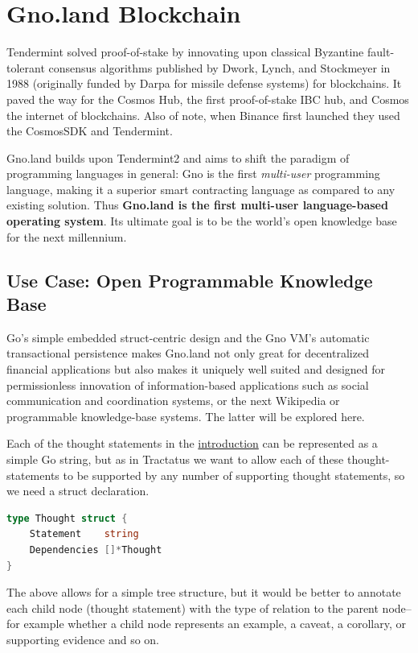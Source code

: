 \documentclass[12pt,a4paper]{article}
\begin{document}
\newpage

\section{Gno.land Blockchain}\label{gno.land-blockchain}

Tendermint solved proof-of-stake by innovating upon classical Byzantine
fault-tolerant consensus algorithms published by Dwork, Lynch, and
Stockmeyer in 1988 (originally funded by Darpa for missile defense
systems) for blockchains. It paved the way for the Cosmos Hub, the first
proof-of-stake IBC hub, and Cosmos the internet of blockchains. Also of
note, when Binance first launched they used the CosmosSDK and
Tendermint.

Gno.land builds upon Tendermint2 and aims to shift the paradigm of
programming languages in general: Gno is the first \emph{multi-user}
programming language, making it a superior smart contracting language as
compared to any existing solution. Thus \textbf{Gno.land is the first
multi-user language-based operating system}. Its ultimate goal is to be
the world's open knowledge base for the next millennium.

\subsection{Use Case: Open Programmable Knowledge
Base}\label{use-case-open-programmable-knowledge-base}

Go's simple embedded struct-centric design and the Gno VM's automatic
transactional persistence makes Gno.land not only great for
decentralized financial applications but also makes it uniquely well
suited and designed for permissionless innovation of information-based
applications such as social communication and coordination systems, or
the next Wikipedia or programmable knowledge-base systems. The latter
will be explored here.

Each of the thought statements in the
\hyperref[gno-land-for-mass-awakening]{introduction} can be represented
as a simple Go string, but as in Tractatus we want to allow each of
these thought- statements to be supported by any number of supporting
thought statements, so we need a struct declaration.

\begin{lstlisting}[language=Go]
type Thought struct {
    Statement    string
    Dependencies []*Thought
}
\end{lstlisting}

The above allows for a simple tree structure, but it would be better to
annotate each child node (thought statement) with the type of relation
to the parent node-- for example whether a child node represents an
example, a caveat, a corollary, or supporting evidence and so on.
\end{document}
